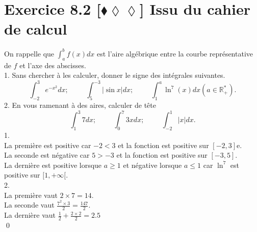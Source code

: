 \documentclass[10pt]{article}
\begin{document}
\section*{Exercice 8.2 [$\blacklozenge\lozenge\lozenge$] Issu du cahier de calcul}
\begin{tcolorbox}[enhanced, width=7in, center, size=fbox, fontupper=\large, drop shadow southwest]
    On rappelle que $\int_a^b{f(x)dx}$ est l'aire algébrique entre la courbe représentative de $f$ et l'axe des abscisses.\\
    1. Sans chercher à les calculer, donner le signe des intégrales suivantes.
    \begin{equation*}
        \int_{-2}^3{e^{-x^2}dx}; \hspace{1cm} \int_5^{-3}{|\sin x|dx}; \hspace{1cm} \int_1^a{\ln^7(x)dx} (a\in\mathbb{R_+^*}).
    \end{equation*}
    2. En vous ramenant à des aires, calculer de tête
    \begin{equation*}
        \int_1^3{7dx}; \hspace{1cm} \int_0^7{3xdx}; \hspace{1cm} \int_{-2}^1{|x|dx}.
    \end{equation*}
    1.\\
    La première est positive car $-2<3$ et la fonction est positive sur $[-2,3]$e.\\
    La seconde est négative car $5>-3$ et la fonction est positive sur $[-3,5]$.\\
    La dernière est positive lorsque $a\geq1$ et négative lorsque $a\leq1$ car $\ln^7$ est positive sur $[1,+\infty[$.\\
    2.\\
    La première vaut $2\times7=14$.\\
    La seconde vaut $\frac{7^2\times3}{2}=\frac{147}{2}$.\\
    La dernière vaut $\frac{1}{2}+\frac{2\times2}{2}=2.5$\\
    \qed
\end{tcolorbox}

\end{document}
